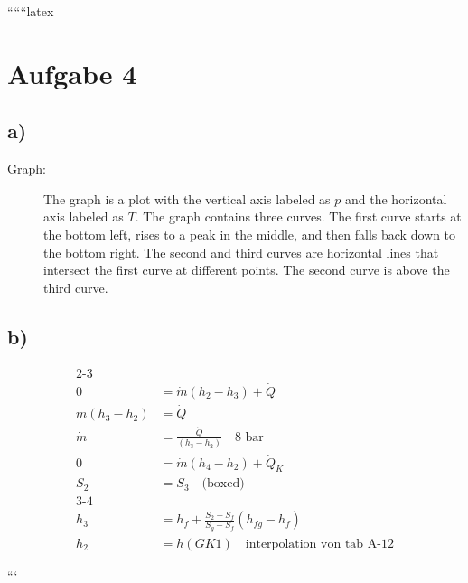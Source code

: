 
``````latex


\section*{Aufgabe 4}

\subsection*{a)}

\begin{description}
    \item[Graph:] The graph is a plot with the vertical axis labeled as $p$ and the horizontal axis labeled as $T$. The graph contains three curves. The first curve starts at the bottom left, rises to a peak in the middle, and then falls back down to the bottom right. The second and third curves are horizontal lines that intersect the first curve at different points. The second curve is above the third curve.
\end{description}

\subsection*{b)}

\begin{align*}
    \text{2-3} \quad & \\
    0 &= \dot{m} (h_2 - h_3) + \dot{Q} \\
    \dot{m} (h_3 - h_2) &= \dot{Q} \\
    \dot{m} &= \frac{\dot{Q}}{(h_3 - h_2)} \quad \text{8 bar} \\
    0 &= \dot{m} (h_4 - h_2) + \dot{Q}_K \\
    S_2 &= S_3 \quad \text{(boxed)} \\
    \text{3-4} \quad & \\
    h_3 &= h_f + \frac{S_2 - S_f}{S_g - S_f} (h_{fg} - h_f) \\
    h_2 &= h(GK1) \quad \text{interpolation von tab A-12}
\end{align*}

```